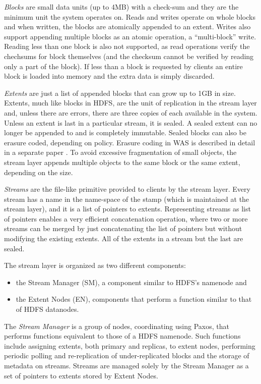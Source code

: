 \emph{Blocks} are small data units (up to 4MB) with a check-sum and they are the minimum unit the system operates on.
Reads and writes operate on whole blocks and when written, the blocks are atomically appended to an extent.
Writes also support appending multiple blocks as an atomic operation, a ``multi-block'' write.
Reading less than one block is also not supported, as read operations verify the chechsums for block themselves (and the checksum cannot be verified by reading only a part of the block).
If less than a block is requested by clients an entire block is loaded into memory and the extra data is simply discarded.

\emph{Extents} are just a list of appended blocks that can grow up to 1GB in size.
Extents, much like blocks in HDFS, are the unit of replication in the stream layer and, unless there are errors, there are three copies of each available in the system.
Unless an extent is last in a particular stream, it is sealed.
A sealed extent can no longer be appended to and is completely immutable.
Sealed blocks can also be erasure coded, depending on policy.
Erasure coding in WAS is described in detail in a separate paper \cite{DBLP:conf/usenix/HuangSXOCG0Y12}.
To avoid excessive fragmentation of small objects, the stream layer appends multiple objects to the same block or the same extent, depending on the size.

\emph{Streams} are the file-like primitive provided to clients by the stream layer.
Every stream has a name in the name-space of the stamp (which is maintained at the stream layer), and it is a list of pointers to extents.
Representing streams as list of pointers enables a very efficient concatenation operation, where two or more streams can be merged by just concatenating the list of pointers but without modifying the existing extents.
All of the extents in a stream but the last are sealed.

The stream layer is organized as two different components:
\begin{itemize}
    \item the Stream Manager (SM), a component similar to HDFS's namenode and
    \item the Extent Nodes (EN), components that perform a function similar to that of HDFS datanodes.
\end{itemize}

The \emph{Stream Manager} is a group of nodes, coordinating using Paxos, that performs functions equivalent to those of a HDFS namenode.
Such functions include assigning extents, both primary and replicas, to extent nodes, performing periodic polling and re-replication of under-replicated blocks and the storage of metadata on streams.
Streams are managed solely by the Stream Manager as a set of pointers to extents stored by Extent Nodes.

